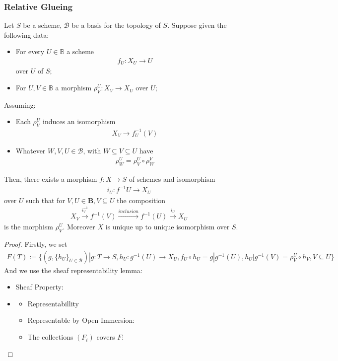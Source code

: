\documentclass[Total.tex]{subfiles}
\begin{document}
				\subsubsection{Relative Glueing}
					\begin{lemma}
						Let $S$ be a scheme, $\mathcal{B}$ be a basis for the topology of $S$. Suppose given the following data:
						\begin{itemize}
							\item For every $U\in \mathbb{B}$ a scheme
							\begin{gather*}
								f_U:X_U\rightarrow U
							\end{gather*}
							over $U$ of $S$;
							\item For $U,V\in \mathbb{B}$ a morphism $\rho^U_V:X_V\rightarrow X_U$ over $U$;
						\end{itemize}
						Assuming:
						\begin{itemize}
							\item Each $\rho_V^U$ induces an isomorphism
							\begin{gather*}
								X_V\rightarrow f_U^{-1}(V)
							\end{gather*}
							\item Whatever $W,V,U\in \mathcal{B}$, with $W\subseteq V\subseteq U$ have
							\begin{gather*}
								\rho^U_W=\rho^U_V\circ \rho^V_W
							\end{gather*}
						\end{itemize}
						Then, there exists a morphism $f:X\rightarrow S$ of schemes and isomorphism
						\begin{gather*}
							i_U:f^{-1}U\rightarrow X_U
						\end{gather*}
						over $U$ such that for $V,U\in \mathbf{B},V\subseteq U$ the composition
						\begin{gather*}
							X_V\stackrel{i_V^{-1}}{\rightarrow} f^{-1}(V)\stackrel{inclusion}{\rightarrow} f^{-1}(U)\stackrel{i_U}{\rightarrow} X_U
						\end{gather*}
						is the morphism $\rho^U_V$. Moreover $X$ is unique up to unique isomorphism over $S$.
					\end{lemma}
					\begin{proof}
						Firstly, we set
						\begin{gather*}
							F(T):=\{(g,\{h_U\}_{U\in \mathcal{B}})|g:T\rightarrow S,h_U:g^{-1}(U)\rightarrow X_U,f_U\circ h_U=g|g^{-1}(U),h_U|g^{-1}(V)=\rho^U_V\circ h_V,V\subseteq U\}
						\end{gather*}
						And we use the sheaf representability lemma:
						\begin{itemize}
							\item Sheaf Property:
							\item \begin{itemize}
								\item Representabillity
								\item Representable by Open Immersion:
								\item The collections $(F_i)$ covers $F$:
							\end{itemize}
						\end{itemize}
					\end{proof}
\end{document}
